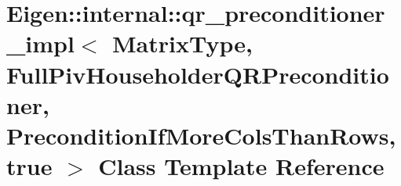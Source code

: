 \hypertarget{class_eigen_1_1internal_1_1qr__preconditioner__impl_3_01_matrix_type_00_01_full_piv_householder_0bfd000ff4c8127883e77da4144b4435}{}\section{Eigen\+:\+:internal\+:\+:qr\+\_\+preconditioner\+\_\+impl$<$ Matrix\+Type, Full\+Piv\+Householder\+Q\+R\+Preconditioner, Precondition\+If\+More\+Cols\+Than\+Rows, true $>$ Class Template Reference}
\label{class_eigen_1_1internal_1_1qr__preconditioner__impl_3_01_matrix_type_00_01_full_piv_householder_0bfd000ff4c8127883e77da4144b4435}
